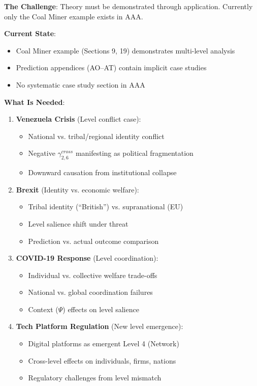 \begin{tcolorbox}[colback=yellow!5!white, colframe=yellow!75!black, title=Status: One Example Only]
\textbf{The Challenge}: Theory must be demonstrated through application. Currently 
only the Coal Miner example exists in AAA.

\textbf{Current State}: 
\begin{itemize}[nosep]
\item Coal Miner example (Sections 9, 19) demonstrates multi-level analysis
\item Prediction appendices (AO--AT) contain implicit case studies
\item No systematic case study section in AAA
\end{itemize}

\textbf{What Is Needed}:
\begin{enumerate}
\item \textbf{Venezuela Crisis} (Level conflict case):
    \begin{itemize}[nosep]
    \item National vs. tribal/regional identity conflict
    \item Negative $\gamma^{cross}_{2,6}$ manifesting as political fragmentation
    \item Downward causation from institutional collapse
    \end{itemize}

\item \textbf{Brexit} (Identity vs. economic welfare):
    \begin{itemize}[nosep]
    \item Tribal identity (``British'') vs. supranational (EU)
    \item Level salience shift under threat
    \item Prediction vs. actual outcome comparison
    \end{itemize}

\item \textbf{COVID-19 Response} (Level coordination):
    \begin{itemize}[nosep]
    \item Individual vs. collective welfare trade-offs
    \item National vs. global coordination failures
    \item Context ($\Psi$) effects on level salience
    \end{itemize}

\item \textbf{Tech Platform Regulation} (New level emergence):
    \begin{itemize}[nosep]
    \item Digital platforms as emergent Level 4 (Network)
    \item Cross-level effects on individuals, firms, nations
    \item Regulatory challenges from level mismatch
    \end{itemize}
\end{enumerate}


\end{tcolorbox}
